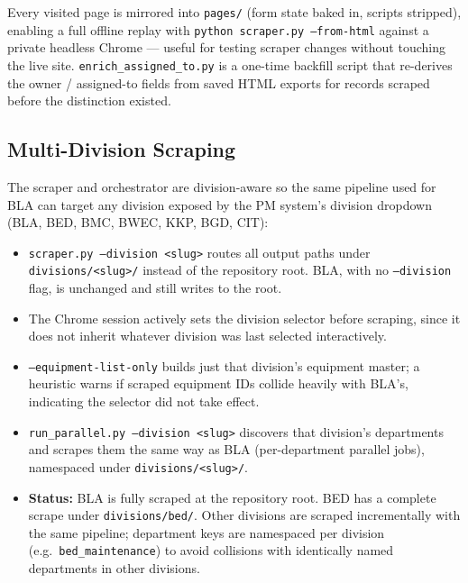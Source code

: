 \documentclass[11pt,a4paper]{article}
\newcommand{\code}[1]{\texttt{#1}}
\begin{document}
Every visited page is mirrored into \code{pages/} (form state baked in,
scripts stripped), enabling a full offline replay with
\code{python scraper.py --from-html} against a private headless Chrome ---
useful for testing scraper changes without touching the live site.
\code{enrich\_assigned\_to.py} is a one-time backfill script that
re-derives the owner / assigned-to fields from saved HTML exports for
records scraped before the distinction existed.

\subsection{Multi-Division Scraping}
\label{sec:divisions}
The scraper and orchestrator are division-aware so the same pipeline used
for BLA can target any division exposed by the PM system's division
dropdown (BLA, BED, BMC, BWEC, KKP, BGD, CIT):

\begin{itemize}
    \item \code{scraper.py --division <slug>} routes all output paths under
          \code{divisions/<slug>/} instead of the repository root. BLA,
          with no \code{--division} flag, is unchanged and still writes to
          the root.
    \item The Chrome session actively sets the division selector before
          scraping, since it does not inherit whatever division was last
          selected interactively.
    \item \code{--equipment-list-only} builds just that division's
          equipment master; a heuristic warns if scraped equipment IDs
          collide heavily with BLA's, indicating the selector did not take
          effect.
    \item \code{run\_parallel.py --division <slug>} discovers that
          division's departments and scrapes them the same way as BLA
          (per-department parallel jobs), namespaced under
          \code{divisions/<slug>/}.
    \item \textbf{Status:} BLA is fully scraped at the repository root. BED
          has a complete scrape under \code{divisions/bed/}. Other
          divisions are scraped incrementally with the same pipeline;
          department keys are namespaced per division (e.g.\
          \code{bed\_maintenance}) to avoid collisions with identically
          named departments in other divisions.
\end{itemize}
\end{document}
